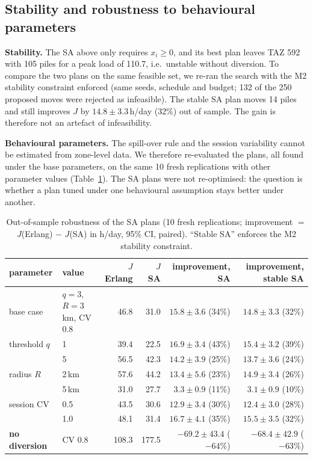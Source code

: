 \documentclass[11pt,a4paper]{article}
\begin{document}
\subsection{Stability and robustness to behavioural parameters}\label{sec:m5rob}
\textbf{Stability.} The SA above only requires $x_i \ge 0$, and its best plan leaves TAZ 592 with 105 piles for a peak load of 110.7, i.e.\ unstable without diversion. To compare the two plans on the same feasible set, we re-ran the search with the M2 stability constraint enforced (same seeds, schedule and budget; 132 of the 250 proposed moves were rejected as infeasible). The stable SA plan moves 14 piles and still improves $J$ by $14.8 \pm 3.3$\,h/day (32\%) out of sample. The gain is therefore not an artefact of infeasibility.

\textbf{Behavioural parameters.} The spill-over rule and the session variability cannot be estimated from zone-level data. We therefore re-evaluated the plans, all found under the base parameters, on the same 10 fresh replications with other parameter values (Table~\ref{tab:m5rob}). The SA plans were not re-optimised: the question is whether a plan tuned under one behavioural assumption stays better under another.
\begin{table}[H]\centering\footnotesize
\caption{Out-of-sample robustness of the SA plans (10 fresh replications; improvement $=$ $J$(Erlang) $-$ $J$(SA) in h/day, 95\% CI, paired). ``Stable SA'' enforces the M2 stability constraint.}\label{tab:m5rob}
\begin{tabular}{@{}llrrrr@{}}\toprule
parameter & value & $J$ Erlang & $J$ SA & improvement, SA & improvement, stable SA\\\midrule
base case & $q = 3$, $R = 3$\,km, CV $0.8$ & 46.8 & 31.0 & $15.8 \pm 3.6$ (34\%) & $14.8 \pm 3.3$ (32\%)\\\midrule
threshold $q$ & 1 & 39.4 & 22.5 & $16.9 \pm 3.4$ (43\%) & $15.4 \pm 3.2$ (39\%)\\
 & 5 & 56.5 & 42.3 & $14.2 \pm 3.9$ (25\%) & $13.7 \pm 3.6$ (24\%)\\
radius $R$ & 2\,km & 57.6 & 44.2 & $13.4 \pm 5.6$ (23\%) & $14.9 \pm 3.4$ (26\%)\\
 & 5\,km & 31.0 & 27.7 & $3.3 \pm 0.9$ (11\%) & $3.1 \pm 0.9$ (10\%)\\
session CV & 0.5 & 43.5 & 30.6 & $12.9 \pm 3.4$ (30\%) & $12.4 \pm 3.0$ (28\%)\\
 & 1.0 & 48.1 & 31.4 & $16.7 \pm 4.1$ (35\%) & $15.5 \pm 3.5$ (32\%)\\\midrule
\textbf{no diversion} & CV 0.8 & 108.3 & 177.5 & $\mathbf{-69.2 \pm 43.4}$ ($-64\%$) & $\mathbf{-68.4 \pm 42.9}$ ($-63\%$)\\\bottomrule
\end{tabular}
\end{table}
\end{document}
